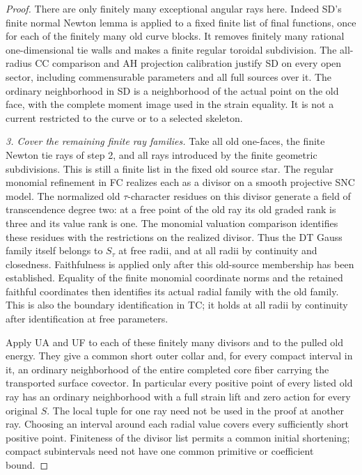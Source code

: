 \begin{proof}
There are only finitely many exceptional angular rays here.
Indeed SD's finite normal Newton lemma is applied to a fixed
finite list of final functions, once for each of the finitely
many old curve blocks.  It removes finitely many rational
one-dimensional tie walls and makes a finite regular toroidal
subdivision.  The all-radius CC comparison and AH projection
calibration justify SD on every open sector, including
commensurable parameters and all full sources over it.  The
ordinary neighborhood in SD is a neighborhood of the actual
point on the old face, with the complete moment image used in
the strain equality.  It is not a current restricted to the
curve or to a selected skeleton.

\emph{3. Cover the remaining finite ray families.}
Take all old one-faces, the finite Newton tie rays of step 2,
and all rays introduced by the finite geometric subdivisions.
This is still a finite list in the fixed old source star.
The regular monomial refinement in FC realizes each as a
divisor on a smooth projective SNC model.  The normalized old
$\tau$-character residues on this divisor generate a field of
transcendence degree two: at a free point of the old ray its
old graded rank is three and its value rank is one.  The
monomial valuation comparison identifies these residues with
the restrictions on the realized divisor.  Thus the DT Gauss
family itself belongs to $S_\tau$ at free radii, and at all
radii by continuity and closedness.  Faithfulness is applied
only after this old-source membership has been established.
Equality of the finite monomial coordinate norms and the
retained faithful coordinates then identifies its actual radial
family with the old family.  This is also the boundary
identification in TC; it holds at all radii by continuity after
identification at free parameters.

Apply UA and UF to each of these finitely many divisors and
to the pulled old energy.  They give a common short outer collar
and, for every compact interval in it, an ordinary neighborhood
of the entire completed core fiber carrying the transported
surface covector.  In particular every positive point of every
listed old ray has an ordinary neighborhood with a full strain
lift and zero action for every original $S$.  The local tuple
for one ray need not be used in the proof at another ray.
Choosing an interval around each radial value covers every
sufficiently short positive point.  Finiteness of the divisor
list permits a common initial shortening; compact subintervals
need not have one common primitive or coefficient bound.


\end{proof}
